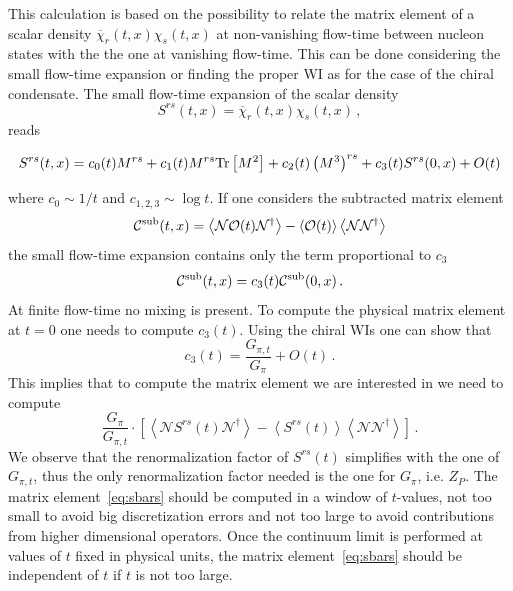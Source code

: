 \documentclass[aps,prc,twocolumn,showpacs,floatfix,nofootinbib,preprintnumbers,superscriptaddress,amsmath,amssymb]{revtex4-1}
\def\chibar{\overline{\chi}}
\def\mcC{\mathcal{C}}
\def\mcN{\mathcal{N}}
\def\mcO{\mathcal{O}}
\newcommand{\be}{\begin{equation}}
\newcommand{\ee}{\end{equation}}
\begin{document}
This calculation is based on the possibility to relate the matrix element of 
a scalar density $\chibar_r(t,x)\chi_s(t,x)$
at non-vanishing flow-time between nucleon states
with the the one at vanishing flow-time.
This can be done considering the small flow-time expansion
or finding the proper WI as for the case
of the chiral condensate.
The small flow-time expansion of the scalar density 
\be
S^{rs}(t,x) = \chibar_r(t,x)\chi_s(t,x)\,,
\ee
reads
\begin{widetext}
\be
S^{rs}(t,x) = c_0(t)M^{rs} + c_1(t)M^{rs}{\rm Tr}\left[M^2\right] + c_2(t)\left(M^3\right)^{rs} + c_3(t)S^{rs}(0,x) + O(t)
\ee
\end{widetext}
where $c_0 \sim 1/t$ and $c_{1,2,3} \sim \log t$.
If one considers the subtracted matrix element
\be
\mcC^{\rm sub}(t,x) = \left\langle\mcN \mcO(t) \mcN^\dagger\right\rangle - \left\langle\mcO(t) \right\rangle \left\langle\mcN \mcN^\dagger \right\rangle
\ee
the small flow-time expansion contains only the term proportional to $c_3$
\be
\mcC^{\rm sub}(t,x) = c_3(t)\mcC^{\rm sub}(0,x)\,.
\ee
At finite flow-time no mixing is present.
To compute the physical matrix element at $t=0$ one needs to compute $c_3(t)$.
Using the chiral WIs one can show that
\be
c_3(t) = \frac{G_{\pi,t}}{G_\pi} + O(t)\,.
\ee
This implies that to compute the matrix element we are interested in we need to compute
\be
\frac{G_{\pi}}{G_{\pi,t}} \cdot \left[
\left\langle\mcN S^{rs}(t) \mcN^\dagger\right\rangle - \left\langle S^{rs}(t) \right\rangle \left\langle\mcN \mcN^\dagger \right\rangle\right]\,.
\label{eq:sbars}
\ee
We observe that the renormalization factor of $S^{rs}(t)$ simplifies with the one of $G_{\pi,t}$, thus the
only renormalization factor needed is the one for $G_\pi$, i.e. $Z_P$.
The matrix element~\eqref{eq:sbars} should be computed in a window of $t$-values,
not too small to avoid big discretization errors and not too large to avoid contributions
from higher dimensional operators. Once the continuum limit is performed at values
of $t$ fixed in physical units, the matrix element~\eqref{eq:sbars} should be 
independent of $t$ if $t$ is not too large.
\end{document}
